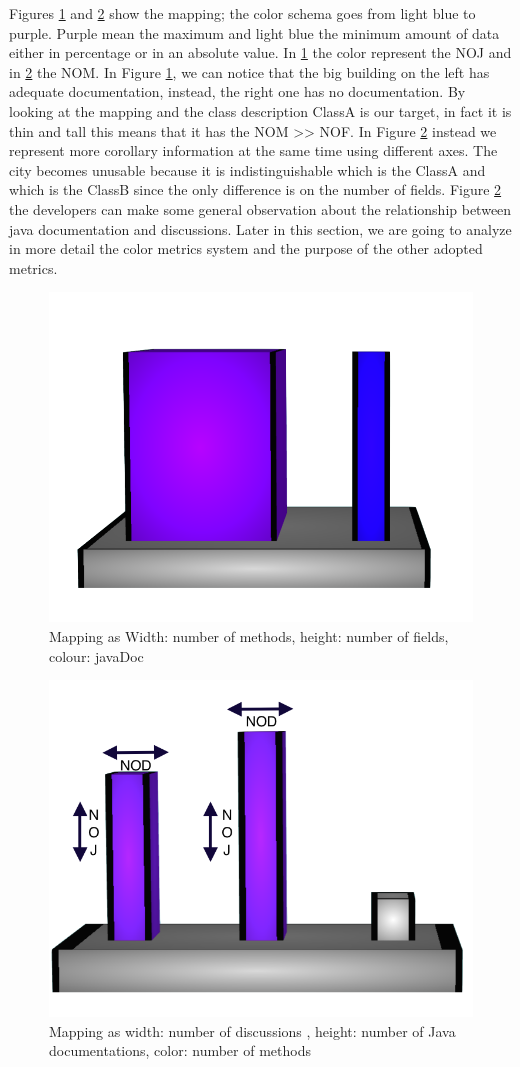 \documentclass[]{usiinfbachelorproject}
\begin{document}
Figures \ref{fig:strictly:a} and \ref{fig:strictly:b} show the mapping; the color schema goes from light blue to purple.
Purple mean the maximum and light blue the minimum amount of data either  in percentage or in an absolute value.
In \ref{fig:strictly:a} the color represent the NOJ and in \ref{fig:strictly:b} the NOM.
In Figure \ref{fig:strictly:a}, we can notice that the big building on the left has adequate documentation, instead, the right one has no documentation. By looking at the mapping and the class description ClassA is our target, in fact it is thin and tall this means that it has the NOM >> NOF.
In Figure \ref{fig:strictly:b} instead we represent more corollary information at the same time using different axes. The city becomes unusable because it is indistinguishable which is the ClassA and which is the ClassB since the only difference is on the number of fields. Figure \ref{fig:strictly:b} the developers can make some general observation about the relationship between java documentation and discussions.
Later in this section, we are going to analyze in more detail the color metrics system and the purpose of the other adopted metrics.

 
 
 
 




\begin{figure}[H]
	\centering
	\includegraphics[width=.45\textwidth]{images/correctC}
	\caption[Methods and Fields]{Mapping as Width: number of methods, height: number of fields, colour: javaDoc\label {fig:strictly:a}}
\end{figure}



\begin{figure}[H]
	\centering
	\includegraphics[width=.45\textwidth]{images/wrongC}
	\caption[Discussions and Java documentations]{Mapping as width: number of discussions , height: number of Java documentations, color: number of methods \label {fig:strictly:b}}
\end{figure}
\end{document}
